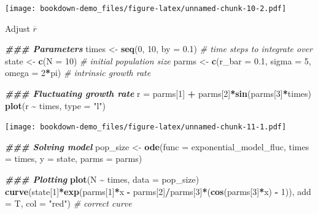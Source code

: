 \documentclass[
]{book}
\newenvironment{Shaded}{\begin{snugshade}}{\end{snugshade}}
\newcommand{\AttributeTok}[1]{\textcolor[rgb]{0.13,0.29,0.53}{#1}}
\newcommand{\CommentTok}[1]{\textcolor[rgb]{0.56,0.35,0.01}{\textit{#1}}}
\newcommand{\DecValTok}[1]{\textcolor[rgb]{0.00,0.00,0.81}{#1}}
\newcommand{\DocumentationTok}[1]{\textcolor[rgb]{0.56,0.35,0.01}{\textbf{\textit{#1}}}}
\newcommand{\FloatTok}[1]{\textcolor[rgb]{0.00,0.00,0.81}{#1}}
\newcommand{\FunctionTok}[1]{\textcolor[rgb]{0.13,0.29,0.53}{\textbf{#1}}}
\newcommand{\NormalTok}[1]{#1}
\newcommand{\OtherTok}[1]{\textcolor[rgb]{0.56,0.35,0.01}{#1}}
\newcommand{\SpecialCharTok}[1]{\textcolor[rgb]{0.81,0.36,0.00}{\textbf{#1}}}
\newcommand{\StringTok}[1]{\textcolor[rgb]{0.31,0.60,0.02}{#1}}
\begin{document}
\texttt{[image: bookdown-demo\_files/figure-latex/unnamed-chunk-10-2.pdf]}

Adjust \(\overline{r}\)

\begin{Shaded}
\begin{Highlighting}[]
\DocumentationTok{\#\#\# Parameters}
\NormalTok{times }\OtherTok{\textless{}{-}} \FunctionTok{seq}\NormalTok{(}\DecValTok{0}\NormalTok{, }\DecValTok{10}\NormalTok{, }\AttributeTok{by =} \FloatTok{0.1}\NormalTok{)  }\CommentTok{\# time steps to integrate over}
\NormalTok{state }\OtherTok{\textless{}{-}} \FunctionTok{c}\NormalTok{(}\AttributeTok{N =} \DecValTok{10}\NormalTok{)  }\CommentTok{\# initial population size}
\NormalTok{parms }\OtherTok{\textless{}{-}} \FunctionTok{c}\NormalTok{(}\AttributeTok{r\_bar =} \FloatTok{0.1}\NormalTok{, }\AttributeTok{sigma =} \DecValTok{5}\NormalTok{, }\AttributeTok{omega =} \DecValTok{2}\SpecialCharTok{*}\NormalTok{pi)  }\CommentTok{\# intrinsic growth rate}

\DocumentationTok{\#\#\# Fluctuating growth rate}
\NormalTok{r }\OtherTok{=}\NormalTok{ parms[}\DecValTok{1}\NormalTok{] }\SpecialCharTok{+}\NormalTok{ parms[}\DecValTok{2}\NormalTok{]}\SpecialCharTok{*}\FunctionTok{sin}\NormalTok{(parms[}\DecValTok{3}\NormalTok{]}\SpecialCharTok{*}\NormalTok{times)}
\FunctionTok{plot}\NormalTok{(r }\SpecialCharTok{\textasciitilde{}}\NormalTok{ times, }\AttributeTok{type =} \StringTok{"l"}\NormalTok{)}
\end{Highlighting}
\end{Shaded}

\texttt{[image: bookdown-demo\_files/figure-latex/unnamed-chunk-11-1.pdf]}

\begin{Shaded}
\begin{Highlighting}[]
\DocumentationTok{\#\#\# Solving model}
\NormalTok{pop\_size }\OtherTok{\textless{}{-}} \FunctionTok{ode}\NormalTok{(}\AttributeTok{func =}\NormalTok{ exponential\_model\_fluc, }\AttributeTok{times =}\NormalTok{ times, }\AttributeTok{y =}\NormalTok{ state, }\AttributeTok{parms =}\NormalTok{ parms)}

\DocumentationTok{\#\#\# Plotting}
\FunctionTok{plot}\NormalTok{(N }\SpecialCharTok{\textasciitilde{}}\NormalTok{ times, }\AttributeTok{data =}\NormalTok{ pop\_size)}
\FunctionTok{curve}\NormalTok{(state[}\DecValTok{1}\NormalTok{]}\SpecialCharTok{*}\FunctionTok{exp}\NormalTok{(parms[}\DecValTok{1}\NormalTok{]}\SpecialCharTok{*}\NormalTok{x }\SpecialCharTok{{-}}\NormalTok{ parms[}\DecValTok{2}\NormalTok{]}\SpecialCharTok{/}\NormalTok{parms[}\DecValTok{3}\NormalTok{]}\SpecialCharTok{*}\NormalTok{(}\FunctionTok{cos}\NormalTok{(parms[}\DecValTok{3}\NormalTok{]}\SpecialCharTok{*}\NormalTok{x) }\SpecialCharTok{{-}} \DecValTok{1}\NormalTok{)), }\AttributeTok{add =}\NormalTok{ T, }\AttributeTok{col =} \StringTok{"red"}\NormalTok{) }\CommentTok{\# correct curve}
\end{Highlighting}
\end{Shaded}
\end{document}

